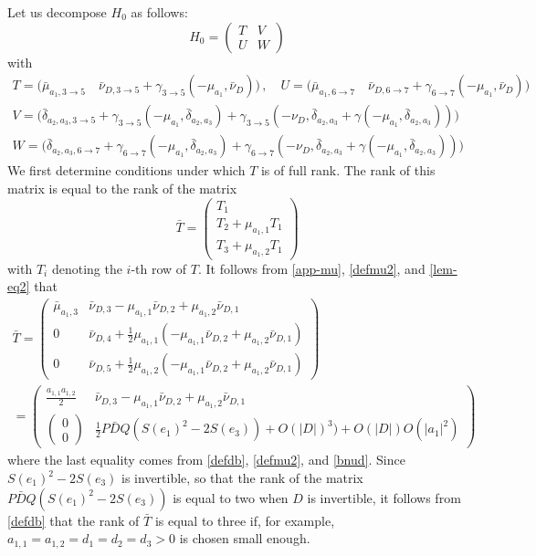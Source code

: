\documentclass[a4paper,twoside]{article}
\begin{document}

Let us decompose $H_0$ as follows:
\[
H_0= \begin{pmatrix}
T & V \\
U & W
\end{pmatrix}
\]
with
\[
\begin{array}{l}
T =  \biggl(
\bar \mu_{a_1,3\rightarrow 5} \quad \bar \nu_{D,3\rightarrow 5} + \gamma_{3\rightarrow5}(-\mu_{a_1},\bar \nu_D)
\biggr) \, , \quad 
U= \biggl(
\bar \mu_{a_1,6\rightarrow 7} \quad \bar \nu_{D,6\rightarrow 7} + \gamma_{6\rightarrow7}(-\mu_{a_1},\bar \nu_D)
\biggr) \\
V=  \bigg(
\bar \delta_{a_2,a_3,3\rightarrow5} + \gamma_{3\rightarrow5}(-\mu_{a_1},\bar \delta_{a_2,a_3}) +
\gamma_{3\rightarrow5}(-\nu_D,\bar \delta_{a_2,a_3} + \gamma(-\mu_{a_1},\bar \delta_{a_2,a_3})) 
\biggr) \\
W=  \biggl(
\bar \delta_{a_2,a_3,6\rightarrow7} + \gamma_{6\rightarrow7}(-\mu_{a_1},\bar \delta_{a_2,a_3}) +
\gamma_{6\rightarrow7}(-\nu_D,\bar \delta_{a_2,a_3} + \gamma(-\mu_{a_1},\bar \delta_{a_2,a_3})) 
\biggr) 
\end{array}
\]
We first determine conditions under which $T$ is of full rank. The rank of this matrix is equal to the 
rank of the matrix
\[
\bar T =
\begin{pmatrix}
T_1 \\
T_2 +\mu_{a_1,1} T_1 \\
T_3  +\mu_{a_1,2} T_1
\end{pmatrix}
\]
with $T_i$ denoting the $i$-th row of $T$. It follows from \eqref{app-mu}, \eqref{defmu2}, and \eqref{lem-eq2} 
that
\[
\begin{array}{l}
\bar T=
\begin{pmatrix}
\bar \mu_{a_1,3} & \bar \nu_{D,3} -\mu_{a_1,1} \bar \nu_{D,2} +\mu_{a_1,2} \bar \nu_{D,1} \\
0 & \bar \nu_{D,4} +\frac{1}{2} \mu_{a_1,1}(-\mu_{a_1,1} \bar \nu_{D,2} +\mu_{a_1,2} \bar \nu_{D,1})  \\
0 & \bar \nu_{D,5} +\frac{1}{2} \mu_{a_1,2}(-\mu_{a_1,1} \bar \nu_{D,2} +\mu_{a_1,2} \bar \nu_{D,1}) 
\end{pmatrix} \\[2em]
 =
\begin{pmatrix}
\frac{a_{1,1} a_{1,2}}{2} &   \bar \nu_{D,3} -\mu_{a_1,1} \bar \nu_{D,2} +\mu_{a_1,2} \bar \nu_{D,1}  \\[1ex]
\begin{pmatrix}
0  \\
0\end{pmatrix} & 
\frac{1}{2} P \bar D Q (S(e_1)^2-2S(e_3))+ O(|D|)^3)+O(|D|)O(|a_1|^2)
\end{pmatrix}
\end{array}
\]
where the last equality comes from \eqref{defdb}, \eqref{defmu2}, and \eqref{bnud}. Since $S(e_1)^2-2S(e_3)$ is invertible,
so that the rank of the matrix 
$P \bar D Q (S(e_1)^2-2S(e_3))$  is equal to two  when 
$D$ is invertible, it follows from \eqref{defdb} that the rank of $\bar T$ is equal to three  if, for example,
$a_{1,1}=a_{1,2}= d_1=d_2=d_3>0$ is chosen small enough. 
\end{document}
